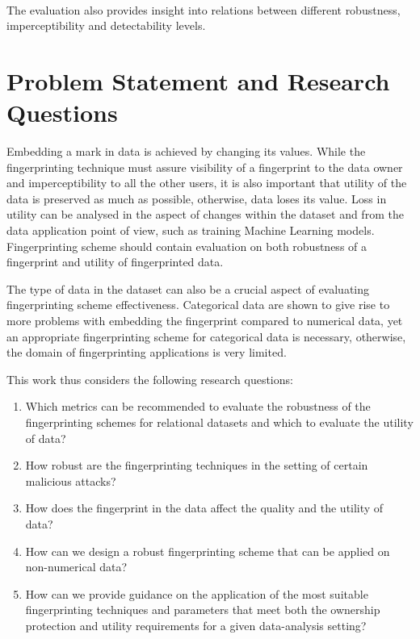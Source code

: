     \paragraph{} The evaluation also provides insight into relations between different robustness, imperceptibility and detectability levels.

\section{Problem Statement and Research Questions}\label{subsec:research-questions}
Embedding a mark in data is achieved by changing its values. While the fingerprinting technique must assure visibility of a fingerprint to the data owner and imperceptibility to all the other users, it is also important that utility of the data is preserved as much as possible, otherwise, data loses its value. Loss in utility can be analysed in the aspect of changes within the dataset and from the data application point of view, such as training Machine Learning models. Fingerprinting scheme should contain evaluation on both robustness of a fingerprint and utility of fingerprinted data. 

The type of data in the dataset can also be a crucial aspect of evaluating fingerprinting scheme effectiveness. Categorical data are shown to give rise to more problems with embedding the fingerprint compared to numerical data, yet an appropriate fingerprinting scheme for categorical data is necessary, otherwise, the domain of fingerprinting applications is very limited.

This work thus considers the following research questions:
\begin{enumerate}
    \item Which metrics can be recommended to evaluate the robustness of the fingerprinting schemes for relational datasets and which to evaluate the utility of data?
    \item How robust are the fingerprinting techniques in the setting of certain malicious attacks? 
    \item How does the fingerprint in the data affect the quality and the utility of data?
    \item How can we design a robust fingerprinting scheme that can be applied on non-numerical data?
    \item How can we provide guidance on the application of the most suitable fingerprinting techniques and parameters that meet both the ownership protection and utility requirements for a given data-analysis setting?
\end{enumerate}

